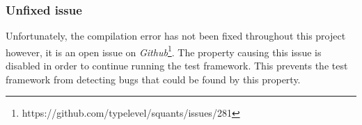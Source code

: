 \subsubsection{Unfixed issue}
Unfortunately, the compilation error has not been fixed throughout this project
however, it is an open issue on
\textit{Github}\footnote{https://github.com/typelevel/squants/issues/281}. The
property causing this issue is disabled in order to continue running the test
framework. This prevents the test framework from detecting bugs that could be
found by this property.
